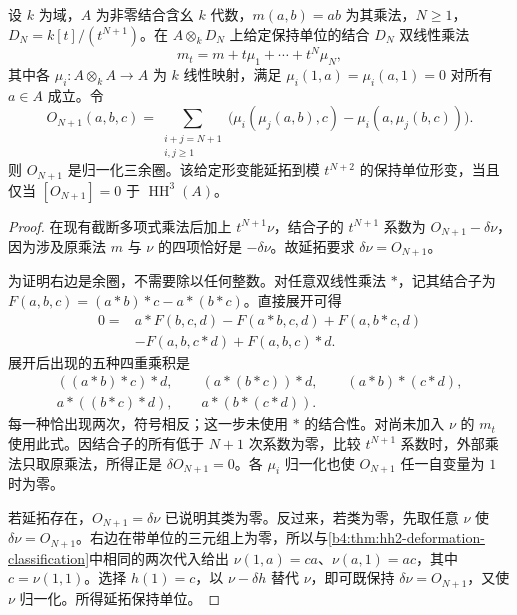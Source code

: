 \begin{theorem}\label{b4:thm:hochschild-obstruction}
	设 \(k\) 为域，\(A\) 为非零结合含幺 \(k\) 代数，\(m(a,b)=ab\) 为其乘法，\(N\ge1\)，\(D_N=k[t]/(t^{N+1})\)。在 \(A\otimes_kD_N\) 上给定保持单位的结合 \(D_N\) 双线性乘法
	\[
		m_t=m+t\mu_1+\cdots+t^N\mu_N,
	\]
	其中各 \(\mu_i:A\otimes_kA\to A\) 为 \(k\) 线性映射，满足 \(\mu_i(1,a)=\mu_i(a,1)=0\) 对所有 \(a\in A\) 成立。令
	\[
		O_{N+1}(a,b,c)= \sum_{\substack{i+j=N+1\\i,j\ge1}} \bigl(\mu_i(\mu_j(a,b),c)-\mu_i(a,\mu_j(b,c))\bigr).
	\]
	则 \(O_{N+1}\) 是归一化三余圈。该给定形变能延拓到模 \(t^{N+2}\) 的保持单位形变，当且仅当 \([O_{N+1}]=0\) 于 \(\operatorname{HH}^3(A)\)。
\end{theorem}
\begin{proof}
	在现有截断多项式乘法后加上 \(t^{N+1}\nu\)，结合子的 \(t^{N+1}\) 系数为 \(O_{N+1}-\delta\nu\)，因为涉及原乘法 \(m\) 与 \(\nu\) 的四项恰好是 \(-\delta\nu\)。故延拓要求 \(\delta\nu=O_{N+1}\)。

	为证明右边是余圈，不需要除以任何整数。对任意双线性乘法 \(*\)，记其结合子为 \(F(a,b,c)=(a*b)*c-a*(b*c)\)。直接展开可得
	\[
		\begin{aligned}
			0={}&a*F(b,c,d)-F(a*b,c,d)+F(a,b*c,d)\\
			&-F(a,b,c*d)+F(a,b,c)*d.
		\end{aligned}
	\]
	展开后出现的五种四重乘积是
	\[
		\begin{gathered}
			((a*b)*c)*d,\qquad (a*(b*c))*d,\qquad (a*b)*(c*d),\\
			a*((b*c)*d),\qquad a*(b*(c*d)).
		\end{gathered}
	\]
	每一种恰出现两次，符号相反；这一步未使用 \(*\) 的结合性。对尚未加入 \(\nu\) 的 \(m_t\) 使用此式。因结合子的所有低于 \(N+1\) 次系数为零，比较 \(t^{N+1}\) 系数时，外部乘法只取原乘法，所得正是 \(\delta O_{N+1}=0\)。各 \(\mu_i\) 归一化也使 \(O_{N+1}\) 任一自变量为 \(1\) 时为零。

	若延拓存在，\(O_{N+1}=\delta\nu\) 已说明其类为零。反过来，若类为零，先取任意 \(\nu\) 使 \(\delta\nu=O_{N+1}\)。右边在带单位的三元组上为零，所以与\cref{b4:thm:hh2-deformation-classification}中相同的两次代入给出 \(\nu(1,a)=ca\)、\(\nu(a,1)=ac\)，其中 \(c=\nu(1,1)\)。选择 \(h(1)=c\)，以 \(\nu-\delta h\) 替代 \(\nu\)，即可既保持 \(\delta\nu=O_{N+1}\)，又使 \(\nu\) 归一化。所得延拓保持单位。
\end{proof}

